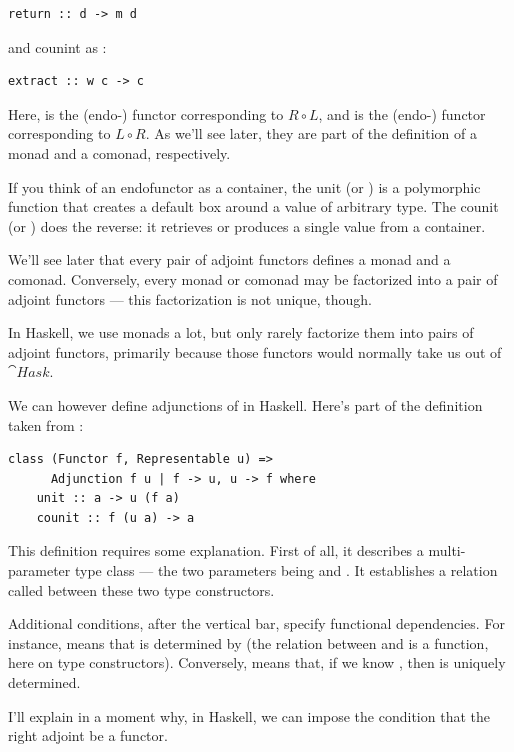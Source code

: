 \begin{Verbatim}
return :: d -> m d
\end{Verbatim}
and counint as :

\begin{Verbatim}
extract :: w c -> c
\end{Verbatim}
Here,  is the (endo-) functor corresponding to $R \circ L$,
and  is the (endo-) functor corresponding to $L \circ R$. As
we'll see later, they are part of the definition of a monad and a
comonad, respectively.

If you think of an endofunctor as a container, the unit (or
) is a polymorphic function that creates a default box
around a value of arbitrary type. The counit (or ) does
the reverse: it retrieves or produces a single value from a container.

We'll see later that every pair of adjoint functors defines a monad and
a comonad. Conversely, every monad or comonad may be factorized into a
pair of adjoint functors --- this factorization is not unique, though.

In Haskell, we use monads a lot, but only rarely factorize them into
pairs of adjoint functors, primarily because those functors would
normally take us out of $\cat{Hask}$.

We can however define adjunctions of  in Haskell.
Here's part of the definition taken from
:

\begin{Verbatim}
class (Functor f, Representable u) =>
      Adjunction f u | f -> u, u -> f where
    unit :: a -> u (f a)
    counit :: f (u a) -> a
\end{Verbatim}
This definition requires some explanation. First of all, it describes a
multi-parameter type class --- the two parameters being  and
. It establishes a relation called  between
these two type constructors.

Additional conditions, after the vertical bar, specify functional
dependencies. For instance,  means that
 is determined by  (the relation between 
and  is a function, here on type constructors). Conversely,
 means that, if we know , then
 is uniquely determined.

I'll explain in a moment why, in Haskell, we can impose the condition
that the right adjoint  be a  functor.


